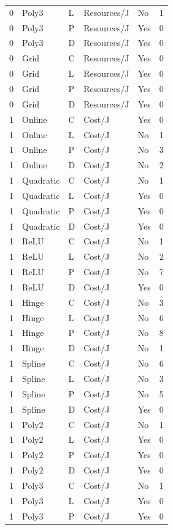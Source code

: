 \begin{longtable}{lllllr}
0 & Poly3 & L & Resources/J & No & 1 \\
0 & Poly3 & P & Resources/J & Yes & 0 \\
0 & Poly3 & D & Resources/J & Yes & 0 \\
0 & Grid & C & Resources/J & Yes & 0 \\
0 & Grid & L & Resources/J & Yes & 0 \\
0 & Grid & P & Resources/J & Yes & 0 \\
0 & Grid & D & Resources/J & Yes & 0 \\
1 & Online & C & Cost/J & Yes & 0 \\
1 & Online & L & Cost/J & No & 1 \\
1 & Online & P & Cost/J & No & 3 \\
1 & Online & D & Cost/J & No & 2 \\
1 & Quadratic & C & Cost/J & No & 1 \\
1 & Quadratic & L & Cost/J & Yes & 0 \\
1 & Quadratic & P & Cost/J & Yes & 0 \\
1 & Quadratic & D & Cost/J & Yes & 0 \\
1 & ReLU & C & Cost/J & No & 1 \\
1 & ReLU & L & Cost/J & No & 2 \\
1 & ReLU & P & Cost/J & No & 7 \\
1 & ReLU & D & Cost/J & Yes & 0 \\
1 & Hinge & C & Cost/J & No & 3 \\
1 & Hinge & L & Cost/J & No & 6 \\
1 & Hinge & P & Cost/J & No & 8 \\
1 & Hinge & D & Cost/J & No & 1 \\
1 & Spline & C & Cost/J & No & 6 \\
1 & Spline & L & Cost/J & No & 3 \\
1 & Spline & P & Cost/J & No & 5 \\
1 & Spline & D & Cost/J & Yes & 0 \\
1 & Poly2 & C & Cost/J & No & 1 \\
1 & Poly2 & L & Cost/J & Yes & 0 \\
1 & Poly2 & P & Cost/J & Yes & 0 \\
1 & Poly2 & D & Cost/J & Yes & 0 \\
1 & Poly3 & C & Cost/J & No & 1 \\
1 & Poly3 & L & Cost/J & Yes & 0 \\
1 & Poly3 & P & Cost/J & Yes & 0 \\

\end{longtable}

